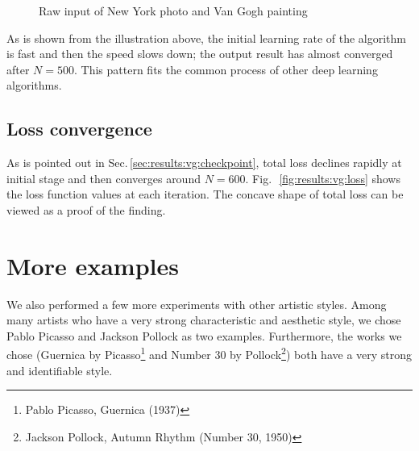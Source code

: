     \begin{figure}[!hbt]
    \center
    \caption{Raw input of New York photo and Van Gogh painting}
    \label{fig:results:vg:checkpoint}
    \end{figure}

As is shown from the illustration above, the initial learning rate of the algorithm is fast
and then the speed slows down; the output result has almost converged after $N=500$.
This pattern fits the common process of other deep learning algorithms.

\subsection{Loss convergence}
As is pointed out in Sec.\,\ref{sec:results:vg:checkpoint},
total loss declines rapidly at initial stage and then converges around $N = 600$.
Fig.\,~\ref{fig:results:vg:loss} shows the loss function values at each iteration.
The concave shape of total loss can be viewed as a proof of the finding.




\section{More examples}

We also performed a few more experiments with other artistic styles.
Among many artists who have a very strong characteristic and aesthetic style,
we chose Pablo Picasso and Jackson Pollock as two examples.
Furthermore, the works we chose
(Guernica by Picasso\footnote{Pablo Picasso, Guernica (1937)} and
Number 30 by Pollock\footnote{Jackson Pollock, Autumn Rhythm (Number 30, 1950)})
both have a very strong and identifiable style.

